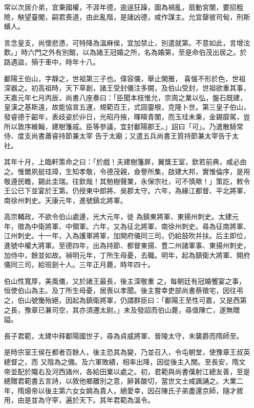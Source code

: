 \begin{pinyinscope}
 常以次居介弟，宜秉國權，不涯年德，逾逞狂躁，圖為禍亂，扇動宮闈，要招粗險，觖望臺閣，嗣君喪道，由此亂階，是諸凶德，咸作謀主。允宜罄彼司甸，刑斯蠙人。



 言念皇支，尚懷悲懣，可特降為溫麻侯，宜加禁止，別遣就第。不意如此，言增泫歎。」時六門之外有別館，以為諸王冠婚之所，名為婚第，至是命伯茂出居之。於路遇盜，殞于車中，時年十八。



 鄱陽王伯山，字靜之，世祖第三子也。偉容儀，舉止閑雅，
 喜慍不形於色，世祖深器之。初高祖時，天下草創，諸王受封儀注多闕，及伯山受封，世祖欲重其事，天嘉元年七月丙辰，尚書八座奏曰：「臣聞本枝惟允，宗周之業以弘，盤石既建，皇漢之基斯遠，故能協宣五運，規範百王，式固靈根，克隆卜世。第三皇子伯山，發睿德于齠年，表歧姿於丱日，光昭丹掖，暉暎青闈，而玉珪未秉，金錫靡駕，豈所以敦序維翰，建樹籓戚。臣等參議，宜封鄱陽郡王。」詔曰「可」。乃遣散騎常侍、度支尚書蕭睿持節兼太宰
 告于太廟；又遣五兵尚書王質持節兼太宰告于太社。



 其年十月，上臨軒策命之曰：「於戲！夫建樹籓屏，翼獎王室，欽若前典，咸必由之。惟爾夙挺珪璋，生知孝敬，令德茂親，僉譽所集，啟建大邦，實惟倫序，是用敬遵民瞻，錫此圭瑞。往欽哉！其勉樹聲業，永保宗社，可不慎歟！」策訖，敕令王公已下並宴於王第。仍授東中郎將、吳郡太守。六年，為緣江都督、平北將軍、南徐州刺史。天康元年，進號鎮北將軍。



 高宗輔政，不欲令伯山處邊，光大元年，徙
 為鎮東將軍、東揚州刺史。太建元年，徵為中衛將軍、中領軍。六年，又為征北將軍、南徐州刺史。尋為征南將軍、江州刺史。十一年，入為護軍將軍，加開府儀同三司，仍給鼓吹并扶。后主即位，進號中權大將軍。至德四年，出為持節、都督東揚、豊二州諸軍事、東揚州刺史，加侍中，餘並如故。禎明元年，丁所生母憂，去職。明年，起為鎮衛大將軍、開府儀同三司，給班劍十人。三年正月薨，時年四十。



 伯山性寬厚，美風儀，又於諸王最長，後主深敬重
 之，每朝廷有冠婚饗宴之事，恒使伯山為主。及丁所生母憂，居喪以孝聞。後主嘗幸吏部尚書蔡徵宅，因往弔之，伯山號慟殆絕，因起為鎮衛將軍，仍謂群臣曰：「鄱陽王至性可嘉，又是西第之長，豫章已兼司空，其亦須遷太尉。」未及發詔而伯山薨，尋值陳亡，遂無贈謚。



 長子君範，太建中拜鄱陽國世子，尋為貞威將軍、晉陵太守，未襲爵而隋師至。



 是時宗室王侯在都者百餘人，後主恐其為變，乃並召入，令屯朝堂，使豫章王叔英總督之，而
 又陰為之備。及六軍敗績，相率出降，因從後主入關。至長安，隋文帝並配於隴右及河西諸州，各給田業以處之。初，君範與尚書僕射江總友善，至是總贈君範書五言詩，以敘他鄉離別之意，辭甚酸切，當世文士咸諷誦之。大業二年，隋煬帝以後主第六女女婤為貴人，絕愛幸，因召陳氏子弟盡還京師，隨才敘用，由是並為守宰，遍於天下。其年君範為溫令。




\end{pinyinscope}
